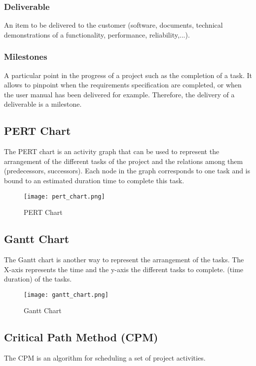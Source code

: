 \subsubsection{Deliverable}
An item to be delivered to the customer (software, documents, technical demonstrations of a functionality, performance, reliability,...).

\subsubsection{Milestones}
A particular point in the progress of a project such as the completion of a task. It allows to pinpoint when the requirements specification are completed, or when the user manual has been delivered for example. Therefore, the delivery of a deliverable is a milestone.

\subsection{PERT Chart}
The PERT chart is an activity graph that can be used to represent the arrangement of the different tasks of the project and the relations among them (predecessors, successors). Each node in the graph corresponds to one task and is bound to an estimated duration time to complete this task.

\begin{figure}[!ht]
    \centering
    \texttt{[image: pert\_chart.png]}
    \caption{PERT Chart}
\end{figure}
\FloatBarrier{}

\subsection{Gantt Chart}
The Gantt chart is another way to represent the arrangement of the tasks. The X-axis represents the time and the y-axis the different tasks to complete.
(time duration) of the tasks.

\begin{figure}[!ht]
    \centering
    \texttt{[image: gantt\_chart.png]}
    \caption{Gantt Chart}
\end{figure}
\FloatBarrier{}

\subsection{Critical Path Method (CPM)}

The CPM is an algorithm for scheduling a set of project activities.\\

